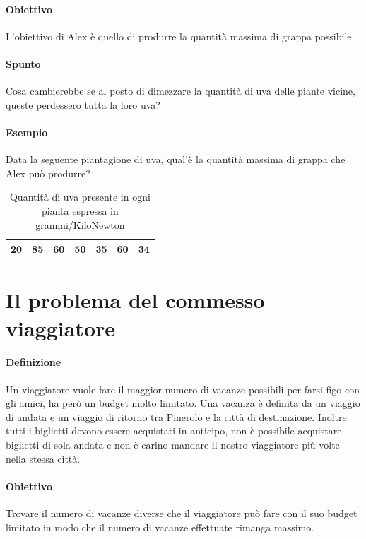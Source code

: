     \paragraph{Obiettivo} L'obiettivo di Alex è quello di produrre la quantità massima di grappa possibile.
    \paragraph{Spunto} Cosa cambierebbe se al posto di dimezzare la quantità di uva delle piante vicine, queste perdessero tutta la loro uva?
    \paragraph{Esempio} Data la seguente piantagione di uva, qual'è la quantità massima di grappa che Alex può produrre?

    \begin{table}[h!]
        \centering
        \caption{Quantità di uva presente in ogni pianta espressa in grammi/KiloNewton}
        \label{tab:costi_voli}
        \begin{tabular}{|c|c|c|c|c|c|c|}
        \hline
            20 & 85 & 60 & 50 & 35 & 60 & 34\\ \hline
        \end{tabular}
    \end{table}

\newpage
\thispagestyle{chapterInit}
\section*{Il problema del commesso viaggiatore}
    \paragraph{Definizione} Un viaggiatore vuole fare il maggior numero di vacanze possibili per farsi figo con gli amici, ha però un budget molto limitato. Una vacanza è definita da un viaggio di andata e un viaggio di ritorno tra Pinerolo e la città di destinazione. Inoltre tutti i biglietti devono essere acquistati in anticipo, non è possibile acquistare biglietti di sola andata e non è carino mandare il nostro viaggiatore più volte nella stessa città.
    \paragraph{Obiettivo} Trovare il numero di vacanze diverse che il viaggiatore può fare con il suo budget limitato in modo che il numero di vacanze effettuate rimanga massimo.

